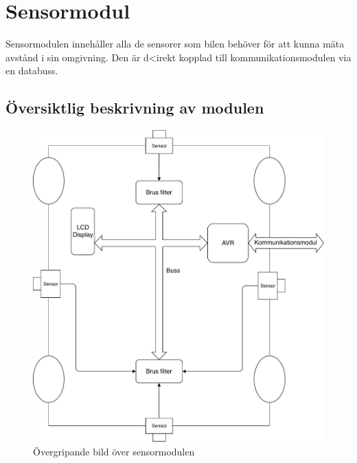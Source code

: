 \documentclass[systemskiss/skiss.tex]{subfiles}
\begin{document}
\section{Sensormodul}
Sensormodulen innehåller alla de sensorer som bilen behöver för att kunna mäta avstånd i sin omgivning. Den är d<irekt kopplad till kommunikationsmodulen via en databuss.
\subsection{Översiktlig beskrivning av modulen}
\begin{figure}[h]
    \centering
    \includegraphics[width=0.6\linewidth]{systemskiss/figures/sensormodul.pdf}
    \caption{Övergripande bild över sensormodulen}
    \label{fig:sensorskiss}
\end{figure}
\end{document}
